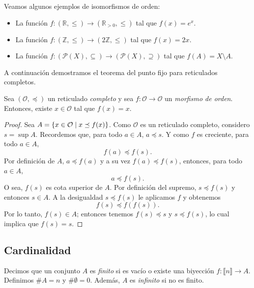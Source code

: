 Veamos algunos ejemplos de isomorfismos de orden:

\begin{itemize}
    \item La función $f: (\mathbb{R}, \leq) \to (\mathbb{R}_{>0}, \leq)$ tal que $f(x) = e^x$.
    \item La función $f: (\mathbb{Z}, \leq) \to (2\mathbb{Z}, \leq)$ tal que $f(x) = 2x$.
    \item La función $f: (\mathcal{P}(X), \subseteq) \to (\mathcal{P}(X), \supseteq)$ tal que $f(A) = X \setminus A$.
\end{itemize}

A continuación demostramos el teorema del punto fijo para reticulados completos.

\begin{theorem}
    Sea $(\mathcal{O}, \preceq)$ un reticulado \textit{completo} y sea $f: \mathcal{O} \to  \mathcal{O}$ un \textit{morfismo de orden}. Entonces, existe $x \in \mathcal{O}$ tal que $f(x)= x$.
\end{theorem} 

\begin{proof}
    Sea $A = \left\{  x \in \mathcal{O} \mid x \preceq f(x)  \right\}$. Como $\mathcal{O}$ es un reticulado completo, considero $s = \sup A$. Recordemos que, para todo $a \in A$, $a \preceq s$. Y como $f$ es creciente, para todo $a \in A$, 
    $$
        f(a) \preceq f(s).
    $$
    Por definición de $A$, $a \preceq f(a)$ y a su vez $f(a) \preceq f(s)$, entonces, para todo $a \in A$,
    $$
        a \preceq f(s).
    $$
    O sea, $f(s)$ es cota superior de $A$. Por definición del supremo, $s \preceq f(s)$ y entonces $s \in A$. A la desigualdad $s \preceq f(s)$ le aplicamos $f$ y obtenemos
    $$
        f(s) \preceq f(f(s)).
    $$
    Por lo tanto, $f(s) \in A$; entonces tenemos $f(s) \preceq s$ y $s \preceq f(s)$, lo cual implica que $f(s) = s$.
\end{proof}

\subsection{Cardinalidad}

\begin{definition}
    Decimos que un conjunto $A$ es \emph{finito} si es vacío o existe una biyección $f: \llbracket n \rrbracket \to  A$. Definimos $\# A = n$ y $\# \emptyset = 0$. Además, $A$ es \emph{infinito} si no es finito.
\end{definition}

